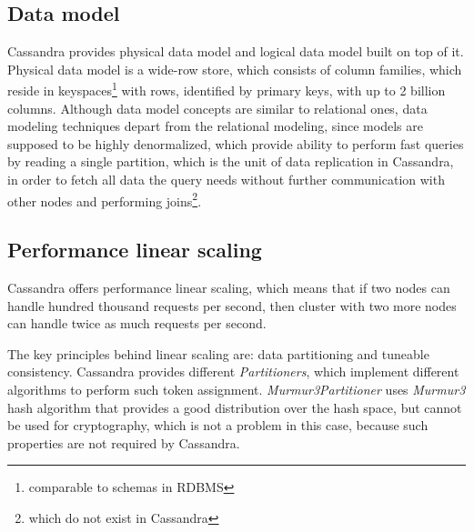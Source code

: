 



\subsection{Data model}
\label{sec:theory:cassandra:datamodel}
Cassandra provides physical data model and logical data model built on top of it. Physical data model is a wide-row store, which consists of column families, which reside in keyspaces\footnote{comparable to schemas in RDBMS} with rows, identified by primary keys, with up to 2 billion columns. 
Although data model concepts are similar to relational ones, data modeling techniques depart from the relational modeling, since models are supposed to be highly denormalized, which provide ability to perform fast queries by reading a single partition, which is the unit of data replication in Cassandra, in order to fetch all data the query needs without further communication with other nodes and performing joins\footnote{which do not exist in Cassandra}.


\subsection{Performance linear scaling}
\label{sec:theory:cassandra:linear}
Cassandra offers performance linear scaling, which means that if two nodes can handle hundred thousand requests per second, then cluster with two more nodes can handle twice as much requests per second. 

The key principles behind linear scaling are: data partitioning and tuneable consistency. 
Cassandra provides different \emph{Partitioners}, which implement different algorithms to perform such token assignment. \emph{Murmur3Partitioner} uses \emph{Murmur3} \cite{Murmur3} hash algorithm that provides a good distribution over the hash space, but cannot be used for cryptography, which is not a problem in this case, because such properties are not required by Cassandra.

